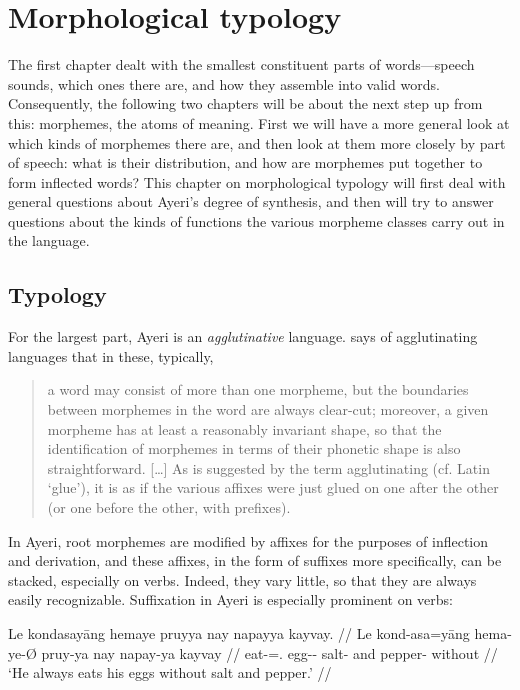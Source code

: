 
\chapter{Morphological typology}

The first chapter dealt with the smallest constituent parts of words---speech 
sounds, which ones there are, and how they assemble into valid words. 
Consequently, the following two chapters will be about the next step up from 
this: morphemes, the atoms of meaning. First we will have a more general look 
at which kinds of morphemes there are, and then look at them more closely by 
part of speech: what is their distribution, and how are morphemes put together 
to form inflected words? This chapter on morphological typology will first 
deal with general questions about Ayeri's degree of synthesis, and then will
try to answer questions about the kinds of functions the various morpheme
classes carry out in the language.

\section{Typology}
\label{sec:typology}

For the largest part, Ayeri is an \emph{agglutinative} 
language. \citet{comrie1989} says of agglutinating languages that in these, 
typically,

\blockcquote[43--44]{comrie1989}{a word may consist of more than one morpheme,
but the boundaries between morphemes in the word are always clear-cut;
moreover, a given morpheme has at least a reasonably invariant shape, so that
the identification of morphemes in terms of their phonetic shape is also
straightforward. […] As is suggested by the term agglutinating (cf. Latin
 `glue'), it is as if the various affixes were just glued on one 
after the other (or one before the other, with prefixes).}

In Ayeri, root morphemes are modified by affixes for the purposes of inflection
and derivation, and these affixes, in the form of suffixes more
specifically, can be stacked, especially on verbs. Indeed, they vary little, so
that they are always easily recognizable. Suffixation in Ayeri is especially
prominent on verbs:

\ex\begingl
	\gla Le kondasayāng hemaye pruyya nay napayya kayvay. //
	\glb Le kond-asa=yāng hema-ye-Ø pruy-ya nay napay-ya kayvay //
	\glc \PatTI{} eat-\Hab{}=\TsgM{}.\Aarg{} egg-\Pl{}-\Top{} salt-\Loc{} 
		and pepper-\Loc{} without //
	\glft `He always eats his eggs without salt and pepper.' //
\endgl\xe

